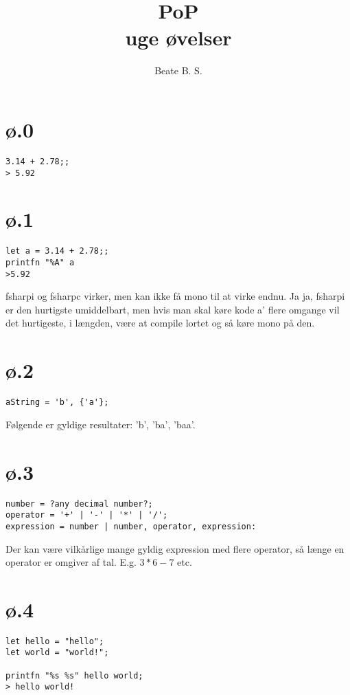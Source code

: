\documentclass[a4paper]{article}
\title{PoP \\ \Large uge øvelser}
\author{Beate B. S.}
\begin{document}
\maketitle
\tableofcontents
\newpage
\section{ø.0}
\begin{lstlisting}
3.14 + 2.78;;
> 5.92
\end{lstlisting}

\section{ø.1}
\begin{lstlisting}
let a = 3.14 + 2.78;;
printfn "%A" a
>5.92
\end{lstlisting}
fsharpi og fsharpc virker, men kan ikke få mono til at virke endnu.
Ja ja, fsharpi er den hurtigste umiddelbart, men hvis man skal køre kode a' flere omgange vil det hurtigeste, i længden, være at compile lortet og så køre mono på den. 

\section{ø.2}
\begin{lstlisting}
aString = 'b', {'a'}; 
\end{lstlisting}
Følgende er gyldige resultater: 'b', 'ba', 'baa'.

\section{ø.3}
\begin{lstlisting}
number = ?any decimal number?;
operator = '+' | '-' | '*' | '/';
expression = number | number, operator, expression:
\end{lstlisting}
Der kan være vilkårlige mange gyldig expression med flere operator, så længe en operator er omgiver af tal. E.g. $3 * 6 - 7$ etc.

\section{ø.4}
\begin{lstlisting}
let hello = "hello";
let world = "world!";

printfn "%s %s" hello world;
> hello world!
\end{lstlisting}
\end{document}
